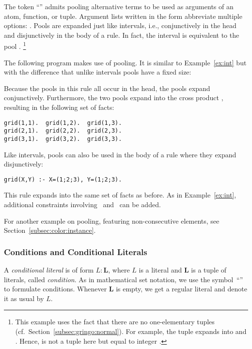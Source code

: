 The token ``\code{;}'' admits pooling alternative terms
to be used as arguments of an atom, function, or tuple. %
Argument lists written in the form  abbreviate multiple options:
.
Pools are expanded just like intervals, i.e.,
conjunctively in the head and disjunctively in the body of a rule.
In fact, the interval  is equivalent to the pool .%
\footnote{%
  This example uses the fact that there are no one-elementary tuples (cf.~Section~\ref{subsec:gringo:normal}).
For example, the tuple  expands into  and .
Hence,  is not a tuple here but equal to integer .}
\begin{example}\label{ex:pool}
The following program makes use of pooling.
It is similar to Example~\ref{ex:int}
but with the difference that unlike intervals pools have a fixed size:%

%
Because the pools in this rule all occur in the head,
the pools expand conjunctively.
Furthermore, the two pools expand into the cross product ,
resulting in the following set of facts:
\begin{lstlisting}[numbers=none]
grid(1,1).  grid(1,2).  grid(1,3).
grid(2,1).  grid(2,2).  grid(2,3).
grid(3,1).  grid(3,2).  grid(3,3).
\end{lstlisting}
Like intervals, pools can also be used in the body of a rule where they expand disjunctively:
\begin{lstlisting}
grid(X,Y) :- X=(1;2;3), Y=(1;2;3).
\end{lstlisting}
This rule expands into the same set of facts as before.
As in Example~\ref{ex:int}, additional constraints involving~ and~ can be added.
\eexample
\end{example}

For another example on pooling, featuring non-consecutive elements, see Section~\ref{subsec:color:instance}.

\subsubsection{Conditions and Conditional Literals}\label{subsec:gringo:condition}
%
%
A \emph{conditional literal} is of form $L:\boldsymbol{L}$,
where $L$ is a literal and $\boldsymbol{L}$ is a tuple of literals, called \textit{condition}.
As in mathematical set notation,
we use the symbol~``\code{:}'' to formulate conditions.
Whenever $\boldsymbol{L}$ is empty, we get a regular literal and denote it as usual by $L$.

